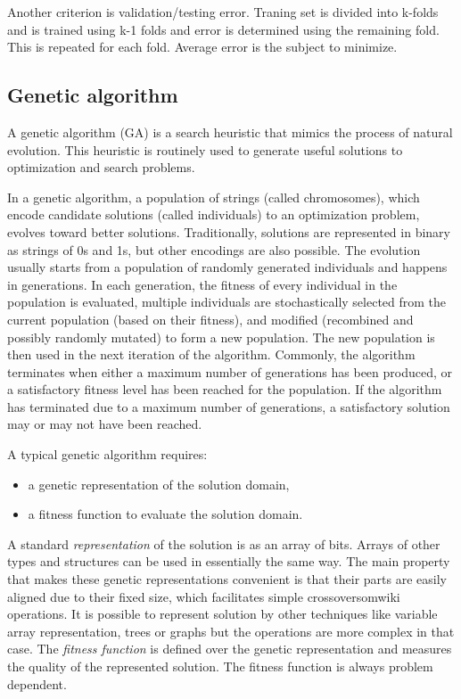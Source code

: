 \documentclass[a4paper]{IEEEtran}
\begin{document}
Another criterion is validation/testing error. Traning set is divided into k-folds
and is trained using k-1 folds and  error 
is determined using the remaining fold. This is repeated for each fold.
Average error is the subject to minimize.

\subsection{Genetic algorithm}
A genetic algorithm (GA) is a search heuristic that mimics the 
process of natural evolution. This heuristic is routinely used to 
generate useful solutions to optimization and search problems.

In a genetic algorithm, a population of strings (called chromosomes), 
which encode candidate solutions (called individuals) to an optimization problem,
evolves toward better solutions.
Traditionally, solutions are represented in binary as strings of 0s and 1s, 
but other encodings are also possible. 
The evolution usually starts from a population of randomly generated individuals 
and happens in generations.
In each generation, the fitness of every individual in the population is evaluated,
multiple individuals are stochastically selected from the current population 
(based on their fitness), and modified (recombined and possibly randomly mutated) 
to form a new population. The new population is then used in the next 
iteration of the algorithm. 
Commonly, the algorithm terminates when either a maximum number of generations 
has been produced, or a satisfactory fitness level has been reached 
for the population. 
If the algorithm has terminated due to a maximum number of generations, 
a satisfactory solution may or may not have been reached.

A typical genetic algorithm requires:
\begin{itemize}
	\item a genetic representation of the solution domain,
	\item a fitness function to evaluate the solution domain.
\end{itemize}
A standard \textit{representation} of the solution is as an array of bits. 
Arrays of other types and structures can be used in essentially the same way. 
The main property that makes these genetic representations convenient 
is that their parts are easily aligned due to their fixed size,
which facilitates simple crossoversomwiki operations. It is possible to 
represent solution by other techniques like variable array representation,
trees or graphs but the operations are more complex in that case.
The \textit{fitness function} is defined over the genetic representation and
measures the quality of the represented solution. The fitness function 
is always problem dependent.
\end{document}
